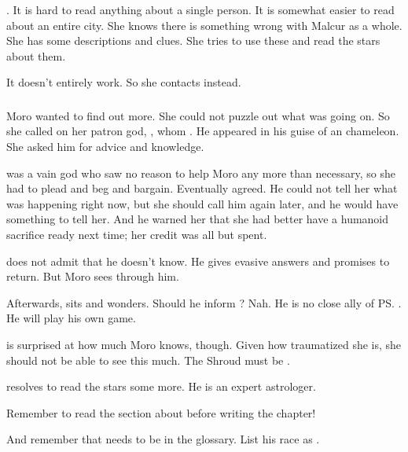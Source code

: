 \begin{garbage}
. 
It is hard to read anything about a single person. 
It is somewhat easier to read about an entire city. 
She knows there is something wrong with Malcur as a whole. 
She has some descriptions and clues. 
She tries to use these and read the stars about them. 

It doesn't entirely work. 
So she contacts \Nasshikerr{} instead. 





\subsubsection{\Nasshikerr}
Moro \Cornel{} wanted to find out more. 
She could not puzzle out what was going on. 
So she called on her patron god, \hs{\Nasshikerr}, whom .
He appeared in his guise of an chameleon.  
She asked him for advice and knowledge. 

\Nasshikerr{} was a vain god who saw no reason to help Moro any more than necessary, so she had to plead and beg and bargain. 
Eventually \Nasshikerr{} agreed. 
He could not tell her what was happening right now, but she should call him again later, and he would have something to tell her. 
And he warned her that she had better have a humanoid sacrifice ready next time; her credit was all but spent. 

\Nasshikerr{} does not admit that he doesn't know. 
He gives evasive answers and promises to return. 
But Moro sees through him. 

Afterwards, \Nasshikerr{} sits and wonders. 
Should he inform \Secherdamon? 
Nah. 
He is no close ally of \ps{\Secherdamon}. 
He will play his own game. 

\Nasshikerr{} is surprised at how much Moro knows, though. 
Given how traumatized she is, she should not be able to see this much. 
The Shroud must be . 

\Nasshikerr{} resolves to read the stars some more. 
He is an expert astrologer. 

Remember to read the section about \hs{\Nasshikerr} before writing the chapter!

And remember that \Nasshikerr{} needs to be in the glossary. 
List his race as \quo{\Taortha}. 












\end{garbage}
